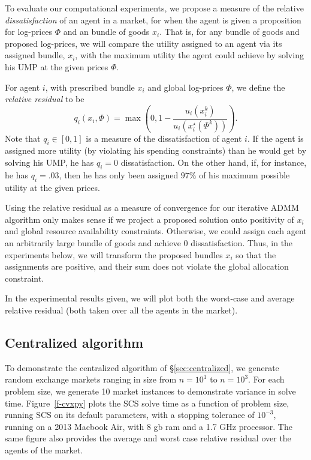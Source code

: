 \documentclass[12pt]{article}
\begin{document}
To evaluate our computational experiments, we propose a measure of the relative
\emph{dissatisfaction} of an agent in a market, for when the agent is given a
proposition for log-prices $\Phi$ and an bundle of goods $x_i$. That is, for
any bundle of goods and proposed log-prices, we will compare the utility
assigned to an agent via its assigned bundle, $x_i$, with the maximum utility
the agent could achieve by solving his UMP at the given prices $\Phi$.

For agent $i$, with prescribed bundle $x_i$ and global log-prices $\Phi$,
we define the \emph{relative residual} to be
\[
q_i(x_i, \Phi)= \max\left(0,1-\frac{u_i(x_i^k)}{u_i(x_i^\star(\Phi^k))}\right).
\]
Note that $q_i \in [0,1]$ is a measure of the dissatisfaction of agent $i$. If
the agent is assigned more utility (by violating his spending constraints) than
he would get by solving his UMP, he has $q_i = 0$ dissatisfaction. On the other
hand, if, for instance, he has $q_i = .03$, then he has only been assigned
$97\%$ of his maximum possible utility at the given prices.

Using the relative residual as a measure of convergence for our iterative ADMM
algorithm only makes sense if we project a proposed solution onto positivity of
$x_i$ and global resource availability constraints. Otherwise, we could assign
each agent an arbitrarily large bundle of goods and achieve 0 dissatisfaction.
Thus, in the experiments below, we will transform the proposed bundles $x_i$ so
that the assignments are positive, and their sum does not violate the global
allocation constraint.

In the experimental results given, we will plot both the worst-case and average
relative residual (both taken over all the agents in the market).

\subsection{Centralized algorithm}
\label{sec:centralized_examples}
To demonstrate the centralized algorithm of \S\ref{sec:centralized},
we generate random exchange markets ranging in size from $n=10^1$ to $n=10^3$.
For each problem size, we generate 10 market instances to demonstrate variance
in solve time. Figure~\ref{f-cvxpy} plots the SCS solve time as a function of
problem size, running SCS on its default parameters, with a stopping tolerance
of $10^{-3}$, running on a 2013 Macbook Air, with 8 gb ram and a 1.7 GHz
processor. The same figure also provides the average and worst case relative
residual over the agents of the market.
\end{document}
